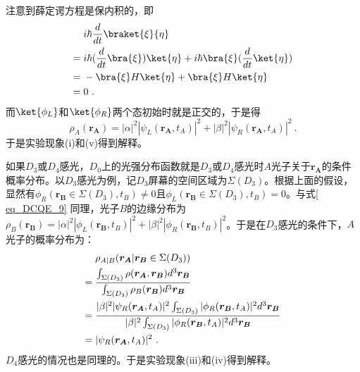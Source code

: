 注意到薛定谔方程是保内积的，即
\begin{align}
&i\hbar\frac{d}{dt}\braket{\xi}{\eta} \notag \\
={}&i\hbar(\frac{d}{dt}\bra{\xi})\ket{\eta}+i\hbar\bra{\xi}(\frac{d}{dt}\ket{\eta}) \notag \\
={}&-\bra{\xi}H\ket{\eta}+\bra{\xi}H\ket{\eta} \notag \\
={}&0~.
\end{align}
而$\ket{\phi_L}$和$\ket{\phi_R}$两个态初始时就是正交的，于是得
\begin{equation}
\rho_A(\boldsymbol{r_A})=|\alpha|^2|\psi_L(\boldsymbol{r_A},t_A)|^2+|\beta|^2|\psi_R(\boldsymbol{r_A},t_A)|^2~.
\label{eq_DCQE_AEdgeDistribution}
\end{equation}
于是实验现象(i)和(v)得到解释。

如果$D_3$或$D_4$感光，$D_0$上的光强分布函数就是$D_3$或$D_4$感光时$A$光子关于$\boldsymbol{r_A}$的条件概率分布。以$D_3$感光为例，记$D_3$屏幕的空间区域为$\Sigma(D_3)$。根据上面的假设，显然有$\phi_R(\boldsymbol{r_B}\in\Sigma(D_3),t_B)\neq 0$且$\phi_L(\boldsymbol{r_B}\in\Sigma(D_3),t_B)=0$。与式\autoref{ eq_DCQE_9} 同理，光子$B$的边缘分布为$\rho_B(\boldsymbol{r_B})=|\alpha|^2|\phi_L(\boldsymbol{r_B},t_B)|^2+|\beta|^2|\phi_R(\boldsymbol{r_B},t_B)|^2$。于是在$D_3$感光的条件下，$A$光子的概率分布为：
\begin{align}
&\rho_{A|B}(\boldsymbol{r_A}|\boldsymbol{r_B}\in\Sigma(D_3)) \notag \\
={}&\frac{\int_{\Sigma(D_3)}\rho(\boldsymbol{r_A},\boldsymbol{r_B})d^3\boldsymbol{r_B}}{\int_{\Sigma(D_3)}\rho_B(\boldsymbol{r_B})d^3\boldsymbol{r_B}} \notag \\
={}&\frac{|\beta|^2|\psi_R(\boldsymbol{r_A},t_A)|^2\int_{\Sigma(D_3)}|\phi_R(\boldsymbol{r_B},t_A)|^2d^3\boldsymbol{r_B}}{|\beta|^2\int_{\Sigma(D_3)}|\phi_R(\boldsymbol{r_B},t_A)|^2d^3\boldsymbol{r_B}} \notag \\
={}&|\psi_R(\boldsymbol{r_A},t_A)|^2~.
\end{align}
$D_4$感光的情况也是同理的。于是实验现象(iii)和(iv)得到解释。

